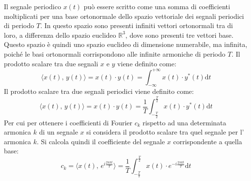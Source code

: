 \documentclass{article}
\newcommand{\df}{\mathrm{d}}
\numberwithin{equation}{subsection}
\begin{document}
Il segnale periodico $x(t)$ può essere scritto come una somma di coefficienti moltiplicati per una base ortonormale dello spazio vettoriale dei segnali periodici di periodo 
$T$. In questo spazio sono presenti infiniti vettori ortonormali tra di loro, a differenza dello spazio euclideo $\mathbb{R}^3$, dove sono presenti tre vettori base. Questo 
spazio è quindi uno spazio euclideo di dimensione numerabile, ma infinita, poiché le basi ortonormali corrispondono alle infinite armoniche di periodo $T$. 
Il prodotto scalare tra due segnali $x$ e $y$ viene definito come:
\begin{equation*}
    \langle x(t),\,y(t)\rangle=x(t)\cdot y(t)=\displaystyle\int_{-\infty}^{+\infty}x(t)\cdot y^*(t)\df t
\end{equation*}
Il prodotto scalare tra due segnali periodici viene definito come:
\begin{equation*}
    \langle x(t),\,y(t)\rangle=x(t)\cdot y(t)=\displaystyle\frac{1}{T}\int_{-\frac{T}{2}}^{\frac{T}{2}}x(t)\cdot y^*(t)\df t
\end{equation*}
Per cui per ottenere i coefficienti di Fourier $c_k$ rispetto ad una determinata armonica $k$ di un segnale $x$ si considera il prodotto scalare tra quel segnale per l'
armonica $k$. Si calcola quindi il coefficiente del segnale $x$ corrispondente a quella base:
\begin{equation}
    c_k=\langle x(t),\,e^{i\frac{2\pi  k t}{T}}\rangle=\displaystyle\frac{1}{T}\int_{-\frac{T}{2}}^{\frac{T}{2}}x(t)\cdot e^{-i\frac{2\pi  k t}{T}}\df t
\end{equation} 
\end{document}

